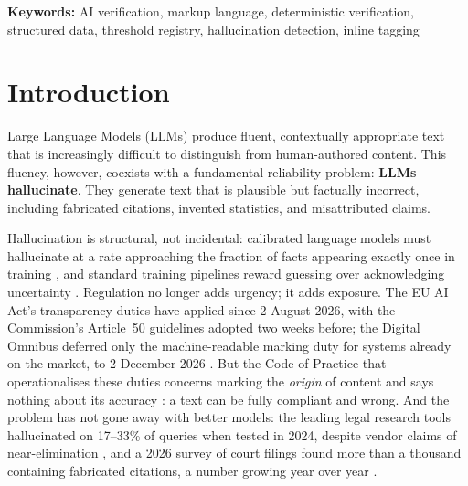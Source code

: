 \documentclass[11pt,a4paper]{article}
\begin{document}
\begin{abstract}
\vspace{0.4em}
We evaluate three frontier models of August 2026 --- Claude Opus 5, Claude Sonnet 5 and DeepSeek V4 Pro --- on two domains, a generated educational benchmark and real SEC EDGAR filings, with three runs each and one correction pass. All three produce the markup on every query, put 90--96\% of their numbers inside a claim, and verify 87--100\% of those claims on the first pass and 92--100\% after one correction. What remains is mostly not a wrong number but a property of the language: in ``Amir of 5OL has a pass rate of 53\%'' the nearest entity is the class, and 69\% of the residual errors are pupil facts bound to a class by that rule. We make the remedy part of the specification --- a fact may name its own record --- and measure it: told that rule, the same models verify 95--100\% of their claims on the first pass and every finance claim, and the binding residue disappears wherever the rule is followed. The specification, verifier, reference implementation, benchmarks and all run artifacts are published.
\end{abstract}

\noindent\textbf{Keywords:} AI verification, markup language, deterministic verification, structured data, threshold registry, hallucination detection, inline tagging


\section{Introduction}

Large Language Models (LLMs) produce fluent, contextually appropriate text that is increasingly difficult to distinguish from human-authored content. This fluency, however, coexists with a fundamental reliability problem: \textbf{LLMs hallucinate}. They generate text that is plausible but factually incorrect, including fabricated citations, invented statistics, and misattributed claims.

Hallucination is structural, not incidental: calibrated language models must hallucinate at a rate approaching the fraction of facts appearing exactly once in training \citep{kalai2024}, and standard training pipelines reward guessing over acknowledging uncertainty \citep{kalai2025}. Regulation no longer adds urgency; it adds exposure. The EU AI Act's transparency duties have applied since 2 August 2026, with the Commission's Article~50 guidelines adopted two weeks before; the Digital Omnibus deferred only the machine-readable marking duty for systems already on the market, to 2 December 2026 \citep{euaiact,art50guidelines2026,omnibus2026}. But the Code of Practice that operationalises these duties concerns marking the \textit{origin} of content and says nothing about its accuracy \citep{transparencycode2026}: a text can be fully compliant and wrong. And the problem has not gone away with better models: the leading legal research tools hallucinated on 17--33\% of queries when tested in 2024, despite vendor claims of near-elimination \citep{magesh2025}, and a 2026 survey of court filings found more than a thousand containing fabricated citations, a number growing year over year \citep{liu2026citations}.
\end{document}
